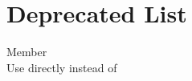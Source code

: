 \chapter{Deprecated List }
\hypertarget{deprecated}{}\label{deprecated}

\begin{DoxyRefList}
\item[Member \doxylink{compatibility_8h_a750cc173bbeafba09323bced06bdee38}{float8\+\_\+t} ]\hfill \\
\label{deprecated__deprecated000001}%
%
Use  directly instead of  
\end{DoxyRefList}